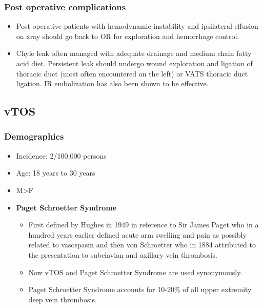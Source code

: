 \documentclass[
]{book}
\begin{document}
\citet{siracuseInfraclavicularFirstRib2015}

\hypertarget{post-operative-complications}{%
\subsubsection{Post operative complications}\label{post-operative-complications}}

\begin{itemize}
\item
  Post operative patients with hemodynamic instability and ipsilateral
  effusion on xray should go back to OR for exploration and hemorrhage
  control. \citet{rinehardtCurrentPracticeThoracic2017}
\item
  Chyle leak often managed with adequate drainage and medium chain
  fatty acid diet. Persistent leak should undergo wound exploration
  and ligation of thoracic duct (most often encountered on the left)
  or VATS thoracic duct ligation.\citep{delaney2017} IR embolization has
  also been shown to be effective.\citep{cope1999}
\end{itemize}

\hypertarget{vtos}{%
\subsection{vTOS}\label{vtos}}

\hypertarget{demographics}{%
\subsubsection{Demographics}\label{demographics}}

\begin{itemize}
\item
  Incidence: 2/100,000 persons
\item
  Age: 18 years to 30 years
  \citep{illigComprehensiveReviewPagetSchroetter2010}
\item
  M\textgreater F
\item
  \textbf{Paget Schroetter Syndrome}

  \begin{itemize}
  \item
    First defined by Hughes in 1949 in reference to Sir James Paget
    who in a hundred years earlier defined acute arm swelling and
    pain as possibly related to vasospasm and then von Schroetter
    who in 1884 attributed to the presentation to subclavian and
    axillary vein thrombosis. \citep{humphries123ThoracicOutlet2019}
  \item
    Now vTOS and Paget Schroetter Syndrome are used synonymously.
  \item
    Paget Schroetter Syndrome accounts for 10-20\% of all upper
    extremity deep vein thrombosis.
    \citep{sekharYearbookVascularEndovascular2018}
  \end{itemize}
\end{itemize}
\end{document}
